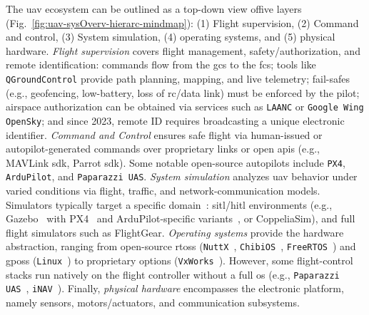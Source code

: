 The \gls{uav} ecosystem can be outlined as a top-down view offive
layers~\cite{glossner2021overview} (Fig.~\ref{fig:uav-sysOverv-hierarc-mindmap}): (1) Flight
supervision, (2) Command and control, (3) System simulation, (4) operating
systems, and (5) physical hardware.
\emph{Flight supervision} covers flight management, safety/authorization, and remote
identification: commands flow from the \gls{gcs} to the \gls{fcs}; tools like
\lstinline{QGroundControl} provide path planning, mapping, and live telemetry;
fail-safes (e.g., geofencing, low-battery, loss of \gls{rc}/data link) must be
enforced by the pilot; airspace authorization can be obtained via services such
as \lstinline{LAANC} or \lstinline{Google Wing OpenSky}; and since 2023, remote
ID requires broadcasting a unique electronic identifier.
%
\emph{Command and Control} ensures safe flight via human-issued or
autopilot-generated commands over proprietary links or open \glspl{api} (e.g.,
MAVLink \gls{sdk}, Parrot \gls{sdk}).
Some notable open-source autopilots include \lstinline{PX4},
\lstinline{ArduPilot}, and \lstinline{Paparazzi UAS}.
%
\emph{System simulation} analyzes \gls{uav} behavior under varied conditions via
flight, traffic, and network-communication models. Simulators typically target a
specific domain~\cite{dimmig_survey_2025}: \gls{sitl}/\gls{hitl} environments
(e.g., Gazebo~\cite{garcia_simulation_2022} with PX4~\cite{px4-sim} and
ArduPilot-specific variants~\cite{arduPilot-sim}, or CoppeliaSim), and full
flight simulators such as FlightGear.
%
\emph{Operating systems} provide the hardware abstraction, ranging from
open-source \glspl{rtos} (\lstinline{NuttX}~\cite{px4-home},
\lstinline{ChibiOS}~\cite{arduPilot-home},
\lstinline{FreeRTOS}~\cite{librePilot-arch}) and \glspl{gpos}
(\lstinline{Linux}~\cite{px4-pilotpi}) to proprietary options
(\lstinline{VxWorks}~\cite{vxWorks-uav-aribus-helionic}). However, some
flight-control stacks run natively on the flight controller without a full
\gls{os} (e.g., \lstinline{Paparazzi UAS}~\cite{paparazzi-github},
\lstinline{iNAV}~\cite{inav-github}).
%
Finally, \emph{physical hardware} encompasses the
electronic platform, namely sensors, motors/actuators, and communication subsystems.


